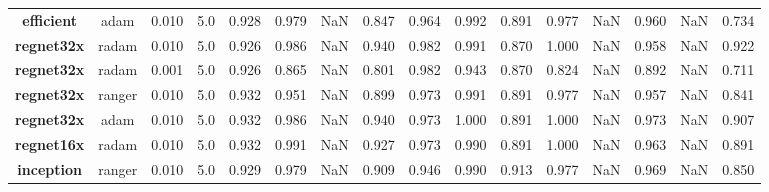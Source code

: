\begin{table}
\begin{tabular}{c|c|c|c|c|c|c|c|c|c|c|c|c|}
\textbf{efficient} &    adam &  0.010 &         5.0 &         0.928 &            0.979 &               NaN &                0.847 &           0.964 &              0.992 &           0.891 &              0.977 &             NaN &              0.960 &             NaN &              0.734 \\
\textbf{regnet32x} &   radam &  0.010 &         5.0 &         0.926 &            0.986 &               NaN &                0.940 &           0.982 &              0.991 &           0.870 &              1.000 &             NaN &              0.958 &             NaN &              0.922 \\
\textbf{regnet32x} &   radam &  0.001 &         5.0 &         0.926 &            0.865 &               NaN &                0.801 &           0.982 &              0.943 &           0.870 &              0.824 &             NaN &              0.892 &             NaN &              0.711 \\
\textbf{regnet32x} &  ranger &  0.010 &         5.0 &         0.932 &            0.951 &               NaN &                0.899 &           0.973 &              0.991 &           0.891 &              0.977 &             NaN &              0.957 &             NaN &              0.841 \\
\textbf{regnet32x} &    adam &  0.010 &         5.0 &         0.932 &            0.986 &               NaN &                0.940 &           0.973 &              1.000 &           0.891 &              1.000 &             NaN &              0.973 &             NaN &              0.907 \\
\textbf{regnet16x} &   radam &  0.010 &         5.0 &         0.932 &            0.991 &               NaN &                0.927 &           0.973 &              0.990 &           0.891 &              1.000 &             NaN &              0.963 &             NaN &              0.891 \\
\textbf{inception} &  ranger &  0.010 &         5.0 &         0.929 &            0.979 &               NaN &                0.909 &           0.946 &              0.990 &           0.913 &              0.977 &             NaN &              0.969 &             NaN &              0.850 \\
\bottomrule
\end{tabular}
\end{table}

